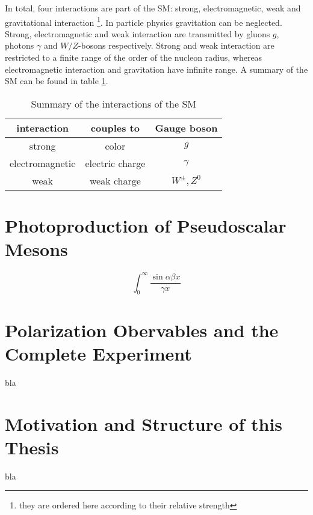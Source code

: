 In total, four interactions are part of the SM: strong, electromagnetic, weak and gravitational interaction \footnote{they are ordered here according to their relative strength}. In particle physics gravitation can be neglected. Strong, electromagnetic and weak interaction are transmitted by gluons $g$, photons $\gamma$ and $W/Z$-bosons respectively. Strong and weak interaction are restricted to a finite range of the order of the nucleon radius, whereas electromagnetic interaction and gravitation have infinite range. A summary of the SM can be found in table \ref{tab:sm1}.

 

\begin{table}[htbp]
	\centering
\begin{tabular}{ccc}
	\toprule
	interaction & couples to & Gauge boson\\
	\hline
	strong & color & $g$\\
	electromagnetic& electric charge & $\gamma$\\
	weak&weak charge & $W^\pm,Z^0$\\
	\bottomrule
\end{tabular}

\caption{Summary of the interactions of the SM}
\label{tab:sm1}
\end{table}

\section{Photoproduction of Pseudoscalar Mesons}
$$\int_0^\infty\frac{\sin \alpha\beta x}{\gamma x}$$
\section{Polarization Obervables and the Complete Experiment}
bla
\section{Motivation and Structure of this Thesis}
bla